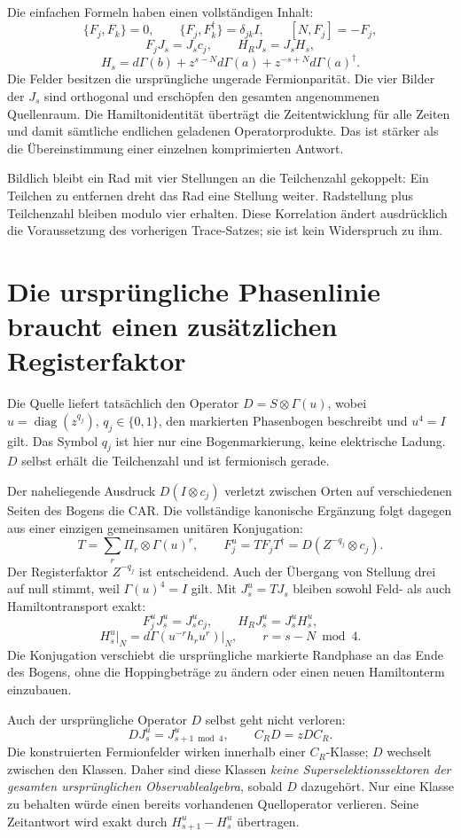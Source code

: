 Die einfachen Formeln haben einen vollständigen Inhalt:
\[
 \{F_j,F_k\}=0,\qquad
 \{F_j,F_k^\dagger\}=\delta_{jk}I,\qquad
 [N,F_j]=-F_j,
\]
\[
 F_jJ_s=J_sc_j,\qquad H_RJ_s=J_sH_s,
\]
\[
 H_s=d\Gamma(b)+z^{s-N}d\Gamma(a)+z^{-s+N}d\Gamma(a)^\dagger.
\]
Die Felder besitzen die ursprüngliche ungerade Fermionparität. Die vier Bilder der $J_s$ sind orthogonal und erschöpfen den gesamten angenommenen Quellenraum. Die Hamiltonidentität überträgt die Zeitentwicklung für alle Zeiten und damit sämtliche endlichen geladenen Operatorprodukte. Das ist stärker als die Übereinstimmung einer einzelnen komprimierten Antwort. 

Bildlich bleibt ein Rad mit vier Stellungen an die Teilchenzahl gekoppelt: Ein Teilchen zu entfernen dreht das Rad eine Stellung weiter. Radstellung plus Teilchenzahl bleiben modulo vier erhalten. Diese Korrelation ändert ausdrücklich die Voraussetzung des vorherigen Trace-Satzes; sie ist kein Widerspruch zu ihm.

\section{Die ursprüngliche Phasenlinie braucht einen zusätzlichen Registerfaktor}
Die Quelle liefert tatsächlich den Operator $D=S\otimes\Gamma(u)$, wobei $u=\operatorname{diag}(z^{q_j})$, $q_j\in\{0,1\}$, den markierten Phasenbogen beschreibt und $u^4=I$ gilt. Das Symbol $q_j$ ist hier nur eine Bogenmarkierung, keine elektrische Ladung. $D$ selbst erhält die Teilchenzahl und ist fermionisch gerade.

Der naheliegende Ausdruck $D(I\otimes c_j)$ verletzt zwischen Orten auf verschiedenen Seiten des Bogens die CAR. Die vollständige kanonische Ergänzung folgt dagegen aus einer einzigen gemeinsamen unitären Konjugation:
\[
 T=\sum_r\Pi_r\otimes\Gamma(u)^r,
 \qquad
 \boxed{F_j^u=T F_jT^\dagger=D(Z^{-q_j}\otimes c_j).}
\]
Der Registerfaktor $Z^{-q_j}$ ist entscheidend. Auch der Übergang von Stellung drei auf null stimmt, weil $\Gamma(u)^4=I$ gilt. Mit $J_s^u=TJ_s$ bleiben sowohl Feld- als auch Hamiltontransport exakt:
\[
 F_j^uJ_s^u=J_s^u c_j,
 \qquad
 H_RJ_s^u=J_s^uH_s^u,
\]
\[
 H_s^u\big|_N=d\Gamma\!\left(u^{-r}h_ru^r\right)\big|_N,
 \qquad r=s-N\bmod4.
\]
Die Konjugation verschiebt die ursprüngliche markierte Randphase an das Ende des Bogens, ohne die Hoppingbeträge zu ändern oder einen neuen Hamiltonterm einzubauen.

Auch der ursprüngliche Operator $D$ selbst geht nicht verloren:
\[
 D J_s^u=J_{s+1\bmod4}^u,\qquad C_RD=zDC_R.
\]
Die konstruierten Fermionfelder wirken innerhalb einer $C_R$-Klasse; $D$ wechselt zwischen den Klassen. Daher sind diese Klassen \emph{keine Superselektionssektoren der gesamten ursprünglichen Observablealgebra}, sobald $D$ dazugehört. Nur eine Klasse zu behalten würde einen bereits vorhandenen Quelloperator verlieren. Seine Zeitantwort wird exakt durch $H_{s+1}^u-H_s^u$ übertragen. 

